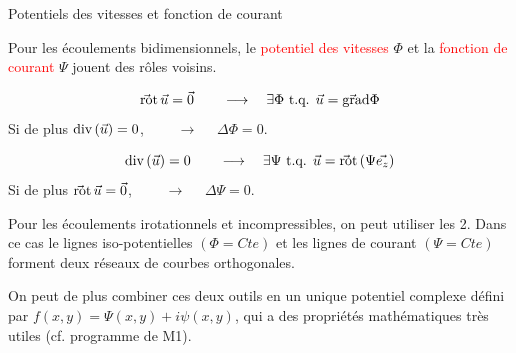 \begin{frame}{Potentiels des vitesses et fonction de courant}

Pour les écoulements bidimensionnels, le \textcolor{red}{potentiel des vitesses} $\Phi$ et la 
 \textcolor{red}{fonction de courant} $\Psi$ jouent des rôles voisins.

 \vspace{.5cm} 
 $$
 \vec{\mbox{\rm ro}}\mbox{\rm t}\, \vec{u}  =  \vec{0} \qquad \longrightarrow \quad \exists   \Phi \mbox{ t.q. } \vec u = \vec{\mbox{\rm gra}}\mbox{\rm d} \Phi
 $$
 Si de plus $\mbox{\rm div}\, (\vec{u}) = 0$, $\qquad  \longrightarrow \quad$ $\Delta \Phi = 0$.


 $$
 \mbox{\rm div}\, ( \vec{u})  =  0 \qquad  \longrightarrow \quad \exists   \Psi \mbox{ t.q. } \vec u = \vec{\mbox{\rm ro}}\mbox{\rm t}\, (\Psi \vec{e_z} )
 $$
 Si de plus $\vec{\mbox{\rm ro}}\mbox{\rm t}\, \vec{u} = \vec{0} $, $\qquad  \longrightarrow \quad$ $\Delta \Psi = 0$.
 
 \vspace{.5cm}
 
 Pour les écoulements irotationnels et incompressibles, on peut utiliser les 2. Dans ce cas le lignes iso-potentielles $(\Phi = Cte)$  et les lignes de courant   $(\Psi = Cte)$ forment 
 deux réseaux de courbes orthogonales.
 
 
 \vspace{.3cm}

 
 On peut de plus combiner ces deux outils en un unique potentiel complexe défini par $f(x,y) = \Psi(x,y) + i \psi(x,y)$, qui a des propriétés mathématiques très utiles (cf. programme de M1).
 
\end{frame}
 


